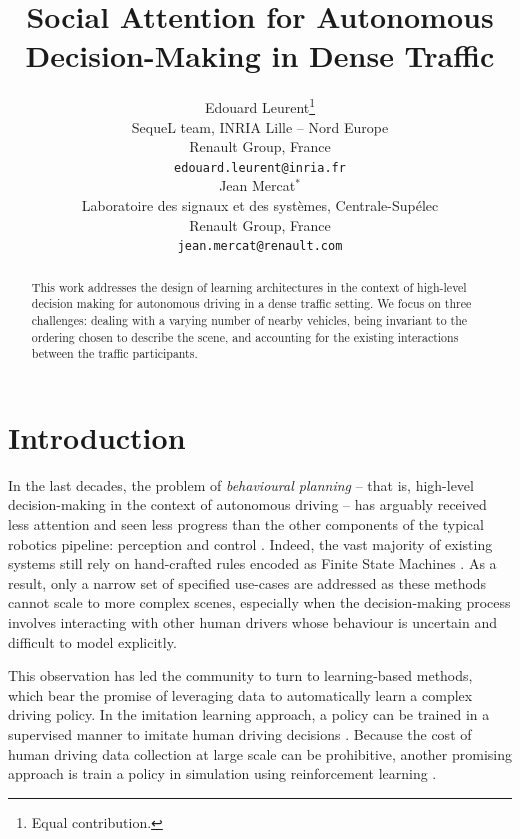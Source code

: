 \documentclass{article}
\title{Social Attention for Autonomous Decision-Making in Dense Traffic}
\author{%
  Edouard Leurent\thanks{Equal contribution.} \\
  SequeL team, INRIA Lille -- Nord Europe\\
  Renault Group, France\\
  \texttt{edouard.leurent@inria.fr} \\
   \And
  Jean Mercat$^*$ \\
  Laboratoire des signaux et des syst\`emes, Centrale-Sup\'elec\\
  Renault Group, France\\
  \texttt{jean.mercat@renault.com} \\
}
\begin{document}
	
	
	
	

\maketitle

\begin{abstract}
  This work addresses the design of learning architectures in the context of high-level decision making for autonomous driving in a dense traffic setting. We focus on three challenges: dealing with a varying number of nearby vehicles, being invariant to the ordering chosen to describe the scene, and accounting for the existing interactions between the traffic participants.
\end{abstract}

\section{Introduction}

In the last decades, the problem of \emph{behavioural planning} -- that is, high-level decision-making in the context of autonomous driving -- has arguably received less attention and seen less progress than the other components of the typical robotics pipeline: perception and control \citep{Gonzalez2016}. Indeed, the vast majority of existing systems still rely on hand-crafted rules encoded as Finite State Machines \citep{Paden2016}. As a result, only a narrow set of specified use-cases are addressed as these methods cannot scale to more complex scenes, especially when the decision-making process involves interacting with other human drivers whose behaviour is uncertain and difficult to model explicitly.

This observation has led the community to turn to learning-based methods, which bear the promise of leveraging data to automatically learn a complex driving policy. In the imitation learning approach, a policy can be trained in a supervised manner to imitate human driving decisions \citep{Pomerleau1989, Ross2011, Bojarski2016, Xu2016, Eraqi2017, Codevilla2017, Rehder2017c, Rezagholiradeh2018, Bansal2018}. Because the cost of human driving data collection at large scale can be prohibitive, another promising approach is train a policy in simulation using reinforcement learning \citep{Cardamone2009, Ross2011}.
\end{document}
